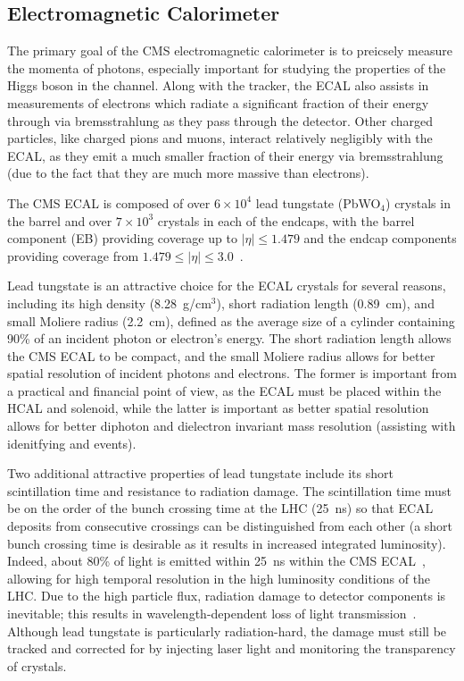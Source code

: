 \subsection{Electromagnetic Calorimeter} \label{sec:cms_ecal}
The primary goal of the CMS electromagnetic calorimeter is to preicsely measure the momenta of photons, especially important for studying the properties of the Higgs boson in the \Hgg channel.
Along with the tracker, the ECAL also assists in measurements of electrons which radiate a significant fraction of their energy through via bremsstrahlung as they pass through the detector.
Other charged particles, like charged pions and muons, interact relatively negligibly with the ECAL, as they emit a much smaller fraction of their energy via bremsstrahlung (due to the fact that they are much more massive than electrons).

The CMS ECAL is composed of over $6 \times 10^4$ lead tungstate (PbWO$_4$) crystals in the barrel and over $7 \times 10^3$ crystals in each of the endcaps, with the barrel component (EB) providing coverage up to $|\eta| \leq 1.479$ and the endcap components providing coverage from $1.479 \leq |\eta| \leq 3.0$~\cite{Chatrchyan:2008aa}.

Lead tungstate is an attractive choice for the ECAL crystals for several reasons, including its high density (8.28~g/cm$^3$), short radiation length (0.89~cm), and small Moliere radius (2.2~cm), defined as the average size of a cylinder containing 90\% of an incident photon or electron's energy.
The short radiation length allows the CMS ECAL to be compact, and the small Moliere radius allows for better spatial resolution of incident photons and electrons.
The former is important from a practical and financial point of view, as the ECAL must be placed within the HCAL and solenoid, while the latter is important as better spatial resolution allows for better diphoton and dielectron invariant mass resolution (assisting with idenitfying \Hgg and \Zee events).

Two additional attractive properties of lead tungstate include its short scintillation time and resistance to radiation damage.
The scintillation time must be on the order of the bunch crossing time at the LHC (25~ns) so that ECAL deposits from consecutive crossings can be distinguished from each other (a short bunch crossing time is desirable as it results in increased integrated luminosity).
Indeed, about 80\% of light is emitted within 25~ns within the CMS ECAL~\cite{Bayatian:2006nff}, allowing for high temporal resolution in the high luminosity conditions of the LHC.
Due to the high particle flux, radiation damage to detector components is inevitable; this results in wavelength-dependent loss of light transmission~\cite{Bayatian:2006nff}.
Although lead tungstate is particularly radiation-hard, the damage must still be tracked and corrected for by injecting laser light and monitoring the transparency of crystals.

